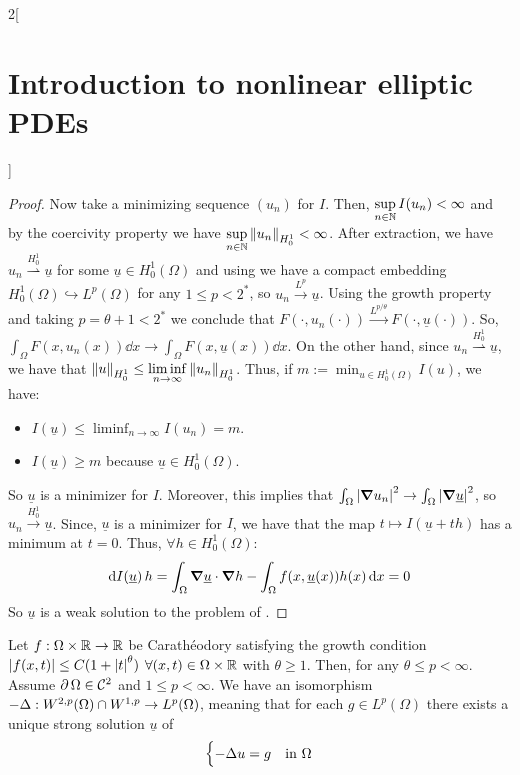 \documentclass[../../../main_math.tex]{subfiles}
\begin{document}
\begin{multicols}{2}[\section{Introduction to nonlinear elliptic PDEs}]
\begin{proof}
    Now take a minimizing sequence $(u_n)$ for $I$. Then, $\displaystyle \sup_{n\in\NN}I(u_n)<\infty$ and by the coercivity property we have $\displaystyle \sup_{n\in\NN}\norm{u_n}_{H_0^1}<\infty$. After extraction, we have $u_n\overset{H_0^1}{\rightharpoonup} \underline{u}$ for some $\underline{u}\in H_0^1(\Omega)$ and using  we have a compact embedding $H_0^1(\Omega)\hookrightarrow L^p(\Omega)$ for any $1\leq p< 2^*$, so $u_n\overset{L^p}{\to} \underline{u}$. Using the growth property and taking $p=\theta+1<2^*$ we conclude that $F(\cdot,u_n(\cdot))\overset{L^{p/\theta}}{\to} F(\cdot,\underline{u}(\cdot))$. So, $\int_\Omega F(x,u_n(x))\dd{x}\to \int_\Omega F(x,\underline{u}(x))\dd{x}$. On the other hand, since $u_n\overset{H_0^1}{\rightharpoonup} \underline{u}$, we have that $\displaystyle \norm{u}_{H_0^1}\leq \liminf_{n\to\infty}\norm{u_n}_{H_0^1}$. Thus, if $\displaystyle m:=\min_{u\in H_0^1(\Omega)}I(u)$, we have:
    \begin{itemize}
      \item $\displaystyle I(\underline{u})\leq \liminf_{n\to\infty}I(u_n)=m$.
      \item $I(\underline{u})\geq m$ because $\underline{u}\in H_0^1(\Omega)$.
    \end{itemize}
    So $\underline{u}$ is a minimizer for $I$. Moreover, this implies that $\int_\Omega \abs{\grad u_n}^2\to \int_\Omega \abs{\grad \underline{u}}^2$, so $u_n\overset{H_0^1}{\to} \underline{u}$. Since, $\underline{u}$ is a minimizer for $I$, we have that the map $t\mapsto I(\underline{u}+th)$ has a minimum at $t=0$. Thus, $\forall h\in H_0^1(\Omega)$:
    $$
      \dd{I(\underline{u})}h=\int_\Omega \grad \underline{u}\cdot \grad h-\int_\Omega f(x,\underline{u}(x))h(x)\dd{x}=0
    $$
    So $\underline{u}$ is a weak solution to the problem of .
  \end{proof}
  \begin{theorem}[Bootstrap]
    Let $f:\Omega\times \RR\to\RR$ be Carathéodory satisfying the growth condition $\abs{f(x,t)}\leq C(1+\abs{t}^\theta)$ $\forall (x,t)\in \Omega\times \RR$ with $\theta\geq 1$. Then, for any $\theta\leq p<\infty$. Assume $\Fr{\Omega}\in \mathcal{C}^2$ and $1\leq p<\infty$. We have an isomorphism $-\laplacian:W^{2,p}(\Omega)\cap W^{1,p}\to L^p(\Omega)$, meaning that for each $g\in L^p(\Omega)$ there exists a unique strong solution $\underline{u}$ of
    $$
      \begin{cases}
        -\laplacian u=g    & \text{in }\Omega      \\

\end{cases}$$
\end{theorem}
\end{multicols}
\end{document}
